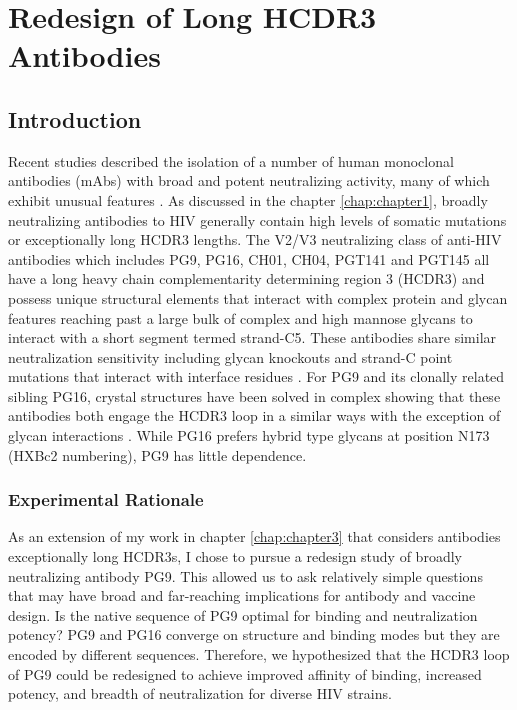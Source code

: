 \chapter{Redesign of Long HCDR3 Antibodies}
\label{chap:chapter4}
\section{Introduction}
Recent studies described the isolation of a number of human monoclonal antibodies (mAbs) with broad and potent neutralizing activity, many of which exhibit unusual features \citep{Bonsignori:2011dq,McLellan:2011dg,Walker:2009cd,Walker:2011ew}. As discussed in the chapter \ref{chap:chapter1}, broadly neutralizing antibodies to HIV generally contain high levels of somatic mutations or exceptionally long HCDR3 lengths. The V2/V3 neutralizing class of anti-HIV antibodies which includes PG9, PG16, CH01, CH04, PGT141 and PGT145 all have a long heavy chain complementarity determining region 3 (HCDR3) and possess unique structural elements that interact with complex protein and glycan features reaching past a large bulk of complex and high mannose glycans to interact with a short segment termed strand-C5. These antibodies share similar neutralization sensitivity including glycan knockouts and strand-C point mutations that interact with interface residues \citep{DoriaRose:2012if,Doores:2010gn}.  For PG9 and its clonally related sibling PG16, crystal structures have been solved in complex showing that these antibodies both engage the HCDR3 loop in a similar ways with the exception of glycan interactions \citep{Pancera:2013ev}. While PG16 prefers hybrid type glycans at position N173 (HXBc2 numbering), PG9 has little dependence.

\subsection{Experimental Rationale}
As an extension of my work in chapter \ref{chap:chapter3} that considers antibodies exceptionally long HCDR3s, I chose to pursue a redesign study of broadly neutralizing antibody PG9. This allowed us to ask relatively simple questions that may have broad and far-reaching implications for antibody and vaccine design. Is the native sequence of PG9 optimal for binding and neutralization potency? PG9 and PG16 converge on structure and binding modes but they are encoded by different sequences. Therefore, we hypothesized that the HCDR3 loop of PG9 could be redesigned to achieve improved affinity of binding, increased potency, and breadth of neutralization for diverse HIV strains.

